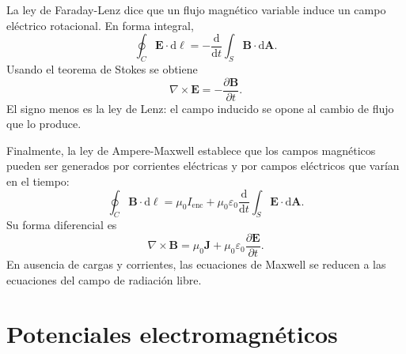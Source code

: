 \documentclass[11pt]{article}
\newcommand{\dd}{\mathrm{d}}
\newcommand{\vb}[1]{\mathbf{#1}}
\begin{document}
La ley de Faraday-Lenz dice que un flujo magn\'etico variable induce un campo
el\'ectrico rotacional. En forma integral,
\begin{equation}
  \oint_C \vb E\cdot \dd\vb \ell
  =
  -\frac{\dd}{\dd t}
  \int_S \vb B\cdot \dd\vb A.
\end{equation}
Usando el teorema de Stokes se obtiene
\begin{equation}
  \boxed{\nabla\times\vb E=-\frac{\partial\vb B}{\partial t}.}
\end{equation}
El signo menos es la ley de Lenz: el campo inducido se opone al cambio de
flujo que lo produce.

Finalmente, la ley de Ampere-Maxwell establece que los campos magn\'eticos
pueden ser generados por corrientes el\'ectricas y por campos el\'ectricos que
var\'ian en el tiempo:
\begin{equation}
  \oint_C \vb B\cdot \dd\vb \ell
  =
  \mu_0 I_{\mathrm{enc}}
  +
  \mu_0\varepsilon_0
  \frac{\dd}{\dd t}
  \int_S \vb E\cdot \dd\vb A.
\end{equation}
Su forma diferencial es
\begin{equation}
  \boxed{
  \nabla\times\vb B
  =
  \mu_0\vb J
  +
  \mu_0\varepsilon_0
  \frac{\partial\vb E}{\partial t}.
  }
\end{equation}
En ausencia de cargas y corrientes, las ecuaciones de Maxwell se reducen a
las ecuaciones del campo de radiaci\'on libre.

\section{Potenciales electromagn\'eticos}
\end{document}

